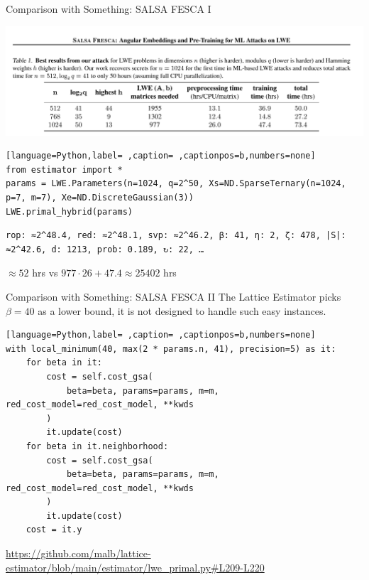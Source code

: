 \documentclass[table,10pt,aspectratio=169]{beamer}
\begin{document}
\begin{frame}[label={sec:orgeb4f9e8},fragile]{Comparison with Something: SALSA FESCA I}
 \begin{center}
\includegraphics[width=.9\linewidth]{./salsa-fresca-results.png}
\end{center}

\begin{lstlisting}[language=Python,label= ,caption= ,captionpos=b,numbers=none]
from estimator import *
params = LWE.Parameters(n=1024, q=2^50, Xs=ND.SparseTernary(n=1024, p=7, m=7), Xe=ND.DiscreteGaussian(3))
LWE.primal_hybrid(params)
\end{lstlisting}

\begin{verbatim}
rop: ≈2^48.4, red: ≈2^48.1, svp: ≈2^46.2, β: 41, η: 2, ζ: 478, |S|: ≈2^42.6, d: 1213, prob: 0.189, ↻: 22, …
\end{verbatim}


\begin{center}
\(\approx 52\) hrs vs \(977 \cdot 26 + 47.4 \approx 25402\) hrs 
\end{center}
\end{frame}

\begin{frame}[label={sec:org621bb23},fragile]{Comparison with \alert{Something}: SALSA FESCA II}
 The Lattice Estimator picks \(\beta = 40\) as a lower bound, it is not designed to handle such easy instances.

\begin{lstlisting}[language=Python,label= ,caption= ,captionpos=b,numbers=none]
with local_minimum(40, max(2 * params.n, 41), precision=5) as it:
    for beta in it:
        cost = self.cost_gsa(
            beta=beta, params=params, m=m, red_cost_model=red_cost_model, **kwds
        )
        it.update(cost)
    for beta in it.neighborhood:
        cost = self.cost_gsa(
            beta=beta, params=params, m=m, red_cost_model=red_cost_model, **kwds
        )
        it.update(cost)
    cost = it.y
\end{lstlisting}

{\footnotesize \url{https://github.com/malb/lattice-estimator/blob/main/estimator/lwe\_primal.py\#L209-L220} \par}
\end{frame}
\end{document}
